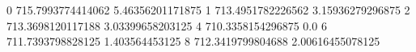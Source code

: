 0 715.7993774414062 5.46356201171875
1 713.4951782226562 3.15936279296875
2 713.3698120117188 3.03399658203125
4 710.3358154296875 0.0
6 711.7393798828125 1.403564453125
8 712.3419799804688 2.00616455078125
